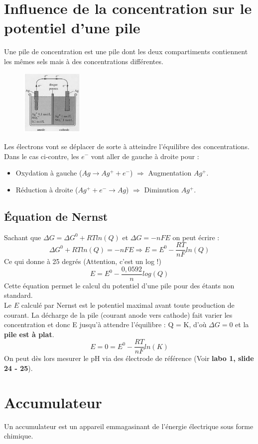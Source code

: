\documentclass	[11pt, a4paper, openany]{book}
\begin{document}
\section{Influence de la concentration sur le potentiel d'une pile}
Une pile de concentration est une pile dont les deux compartiments contiennent les mêmes sels mais à des concentrations différentes. 
\begin{figure}
	\includegraphics[width=3cm]{image3.png}
\end{figure}

Les électrons vont se déplacer de sorte à atteindre l'équilibre des concentrations. Dans le cas ci-contre, les $e^-$ vont aller de gauche à droite pour :
\begin{itemize}
	\item Oxydation à gauche ($Ag \rightarrow Ag^+ + e^-$) $\Rightarrow$ Augmentation $Ag^+$.
	\item Réduction à droite ($Ag^+ +e^- \rightarrow Ag$) $\Rightarrow$ Diminution $Ag^+$.
\end{itemize}
\subsection*{Équation de Nernst}
Sachant que $\Delta G = \Delta G^0 + RTln(Q)$ et $\Delta G = -nFE$ on peut écrire : 
$$\Delta G^0 + RTln(Q) = -nFE \Rightarrow E = E^0 - \frac{RT}{nF}ln(Q)$$
Ce qui donne à 25 degrés (Attention, c'est un log !)
$$E = E^0 - \frac{0,0592}{n}log(Q)$$
Cette équation permet le calcul du potentiel d'une pile pour des étants non standard.\\

Le $E$ calculé par Nernst est le potentiel maximal avant toute production de courant. La décharge de la pile (courant anode vers cathode) fait varier les concentration et donc E jusqu'à attendre l'équilibre : Q = K, d'où $\Delta G = 0$ et la \textbf{pile est à plat}.
$$E = 0 = E^0 - \frac{RT}{nF}ln(K)$$
On peut dès lors mesurer le pH via des électrode de référence (Voir \textbf{labo 1, slide 24 - 25}).

\section{Accumulateur}
Un accumulateur est un appareil emmagasinant de l'énergie électrique sous forme chimique.
\end{document}
